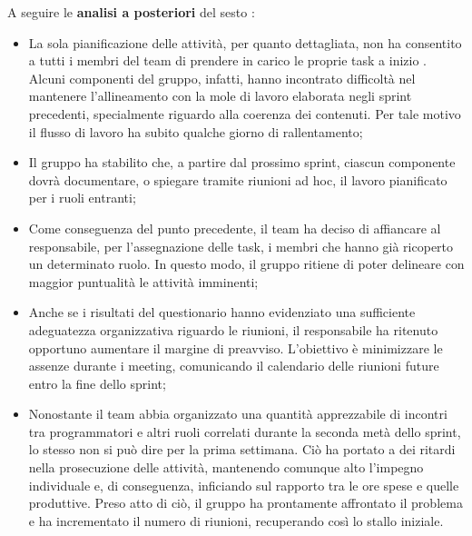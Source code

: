 \vspace{0.5\baselineskip}
\par A seguire le \textbf{analisi a posteriori} del sesto :
\begin{itemize}
  \item La sola pianificazione delle attività, per quanto dettagliata, non ha consentito a tutti i membri del team di prendere in carico le proprie task a inizio . Alcuni componenti del gruppo, infatti, hanno incontrato difficoltà nel mantenere l'allineamento con la mole di lavoro elaborata negli sprint precedenti, specialmente riguardo alla coerenza dei contenuti. Per tale motivo il flusso di lavoro ha subito qualche giorno di rallentamento;
\item Il gruppo ha stabilito che, a partire dal prossimo sprint, ciascun componente dovrà documentare, o spiegare tramite riunioni ad hoc, il lavoro pianificato per i ruoli entranti;
  \item Come conseguenza del punto precedente, il team ha deciso di affiancare al responsabile, per l'assegnazione delle task, i membri che hanno già ricoperto un determinato ruolo. In questo modo, il gruppo ritiene di poter delineare con maggior puntualità le attività imminenti;
  \item Anche se i risultati del questionario hanno evidenziato una sufficiente adeguatezza organizzativa riguardo le riunioni, il responsabile ha ritenuto opportuno aumentare il margine di preavviso. L'obiettivo è minimizzare le assenze durante i meeting, comunicando il calendario delle riunioni future entro la fine dello sprint;
  \item Nonostante il team abbia organizzato una quantità apprezzabile di incontri tra programmatori e altri ruoli correlati durante la seconda metà dello sprint, lo stesso non si può dire per la prima settimana. Ciò ha portato a dei ritardi nella prosecuzione delle attività, mantenendo comunque alto l'impegno individuale e, di conseguenza, inficiando sul rapporto tra le ore spese e quelle produttive. Preso atto di ciò, il gruppo ha prontamente affrontato il problema e ha incrementato il numero di riunioni, recuperando così lo stallo iniziale.
\end{itemize}

